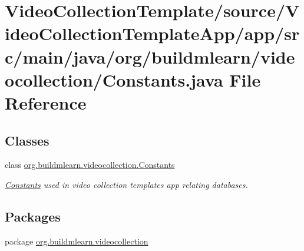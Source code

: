 \hypertarget{VideoCollectionTemplate_2source_2VideoCollectionTemplateApp_2app_2src_2main_2java_2org_2buildmle49be39280111968269347efc863f0676}{}\section{Video\+Collection\+Template/source/\+Video\+Collection\+Template\+App/app/src/main/java/org/buildmlearn/videocollection/\+Constants.java File Reference}
\label{VideoCollectionTemplate_2source_2VideoCollectionTemplateApp_2app_2src_2main_2java_2org_2buildmle49be39280111968269347efc863f0676}
\subsection*{Classes}
\begin{DoxyCompactItemize}
\item 
class \hyperlink{classorg_1_1buildmlearn_1_1videocollection_1_1Constants}{org.\+buildmlearn.\+videocollection.\+Constants}
\begin{DoxyCompactList}\small\item\em \hyperlink{classorg_1_1buildmlearn_1_1videocollection_1_1Constants}{Constants} used in video collection template\textquotesingle{}s app relating databases. \end{DoxyCompactList}\end{DoxyCompactItemize}
\subsection*{Packages}
\begin{DoxyCompactItemize}
\item 
package \hyperlink{namespaceorg_1_1buildmlearn_1_1videocollection}{org.\+buildmlearn.\+videocollection}
\end{DoxyCompactItemize}

